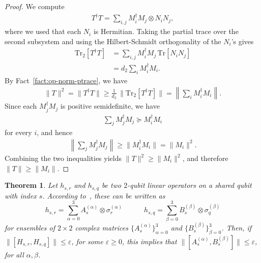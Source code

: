 \documentclass[11pt]{article}
\theoremstyle{plain}
\newtheorem{theorem}{Theorem}[section]
\newcommand{\eps}{\varepsilon}
\begin{document}
\begin{proof}
We compute
\begin{align}
    T^\dagger T
    = \sum_{i,j} M_i^\dagger M_j \otimes N_i N_j,
\end{align}
where we used that each $N_i$ is Hermitian.  Taking the partial trace over
the second subsystem and using the Hilbert-Schmidt orthogonality of the
$N_i$'s gives
\begin{align}
    \mathrm{Tr}_2[T^\dagger T]
    &= \sum_{i,j} M_i^\dagger M_j \, \mathrm{Tr}[N_i N_j] \\
    &= d_2 \sum_i M_i^\dagger M_i .
\end{align}
By Fact~\ref{fact:op-norm-ptrace}, we have
\begin{align}
    \|T\|^2
    = \|T^\dagger T\|
    \geq \frac{1}{d_2}\,\bigl\|\mathrm{Tr}_2[T^\dagger T]\bigr\|
    = \left\|\sum_i M_i^\dagger M_i\right\|.
\end{align}
Since each $M_j^\dagger M_j$ is positive semidefinite, we have
\begin{align}
    \sum_j M_j^\dagger M_j \succeq M_i^\dagger M_i
\end{align}
for every $i$, and hence
\begin{align}
    \left\|\sum_j M_j^\dagger M_j\right\|
    \geq \|M_i^\dagger M_i\|
    = \|M_i\|^2 .
\end{align}
Combining the two inequalities yields $\|T\|^2 \geq \|M_i\|^2$, and
therefore $\|T\| \geq \|M_i\|$.
\end{proof}
\begin{theorem}\label{thm:comm-propagates-down}
Let $h_{s,r}$ and $h_{s,q}$ be two $2$-qubit linear operators on a shared qubit with index $s$. According to~, these can be written as
\begin{equation}
        h_{s,r} = \sum\limits_{\alpha = 0}^{3} A_s^{(\alpha)} \otimes \sigma_r^{(\alpha)} \quad\quad\quad h_{s,q} = \sum\limits_{\beta = 0}^{3} B_s^{(\beta)} \otimes \sigma_q^{(\beta)}
    \end{equation}
for ensembles of $2 \times 2$ complex matrices $\{A_s^{(\alpha)}\}_{\alpha=0}^3$ and $\{B_s^{(\beta)}\}_{\beta=0}^3$.
Then, if $\|[H_{s, r}, H_{s, q}]\| \leq \eps$, for some $\eps \geq 0$, this implies that $\|[A_s^{(\alpha)}, B_s^{(\beta)}]\| \leq \eps$, for all $\alpha, \beta$.
\end{theorem}
\end{document}
